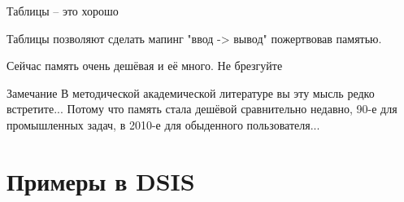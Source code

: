 \begin{frame}{Таблицы -- это хорошо}
	
	Таблицы позволяют сделать мапинг "ввод -> вывод" пожертвовав памятью.
	
	Сейчас память очень дешёвая и её много. Не брезгуйте
	
	\begin{block}{Замечание}
		В методической академической литературе вы эту мысль редко встретите...
		Потому что память стала дешёвой сравнительно недавно, 90-е для промышленных задач, в 2010-е для обыденного пользователя...
	\end{block}


	
\end{frame}











\section{Примеры в DSIS}\label{section:examples_2_dsis}

